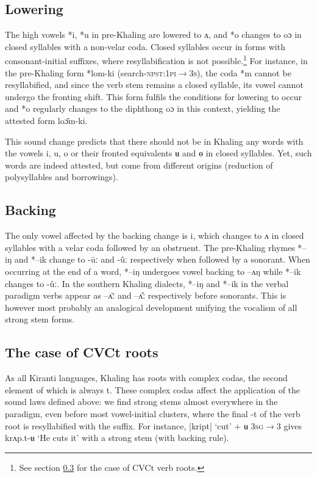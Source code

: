 \documentclass[oldfontcommands,oneside,a4paper,11pt]{article}
\newcommand{\ipa}[1]{{\phon \mbox{#1}}} %
\begin{document}
\subsection{Lowering} \label{sec:lowering}
The high vowels \ipa{*i}, \ipa{*u}   in pre-Khaling are lowered to \ipa{ʌ},  and   \ipa{*o} changes to \ipa{oɔ} in closed syllables with a non-velar coda. Closed syllables occur in forms with consonant-initial suffixes, where resyllabification is not possible.\footnote{See section \ref{sec:cvct} for the case of CVCt verb roots.} For instance, in the pre-Khaling form \ipa{*lom-ki} (search-\textsc{npst:1pi$\rightarrow$3s}), the coda \ipa{*m} cannot be resyllabified, and since the verb stem remains a closed syllable, its vowel cannot undergo the fronting shift. This form fulfils the conditions for  lowering to occur and \ipa{*o} regularly changes to the diphthong \ipa{oɔ} in this context, yielding the attested form \ipa{loɔ̄m-ki}.


This sound change predicts that there should not be in Khaling any words with the vowels \ipa{i}, \ipa{u}, \ipa{o} or their fronted equivalents \ipa{ʉ} and \ipa{ɵ} in closed syllables. Yet, such words are indeed attested, but come from different origins (reduction of polysyllables and borrowings).

\subsection{Backing} \label{sec:backing}
The only vowel affected by the backing change is \ipa{i}, which changes to \ipa{ʌ} in closed syllables with a velar coda followed by an obstruent. The pre-Khaling rhymes \ipa{*--iŋ} and \ipa{*--ik}  change to \ipa{-ūː} and \ipa{-ûː} respectively when followed by a sonorant. When occurring at the end of a word, \ipa{*--iŋ} undergoes vowel backing to \ipa{--ʌŋ} while \ipa{*--ik}  changes to \ipa{-ûː}. In the southern Khaling dialects,  \ipa{*--iŋ} and \ipa{*--ik} in the verbal paradigm verbs appear as \ipa{--ʌ̄ː} and  \ipa{--ʌ̂ː} respectively before sonorants. This is however most probably an analogical development unifying the vocalism of all strong stem forms.


\subsection{The case of CVCt roots} \label{sec:cvct}
As all Kiranti languages, Khaling has roots with complex codas, the second element of which is always \ipa{t}. These complex codas affect the application of the sound laws defined above: we find strong stems almost everywhere in the paradigm, even before most vowel-initial clusters, where the final \ipa{-t} of the verb root is resyllabified with the suffix. For instance,  |kript| `cut' + \ipa{ʉ} \textsc{3sg$\rightarrow$3} gives \ipa{krʌp.t-ʉ} `He cuts it' with a strong stem (with backing rule).
\end{document}
